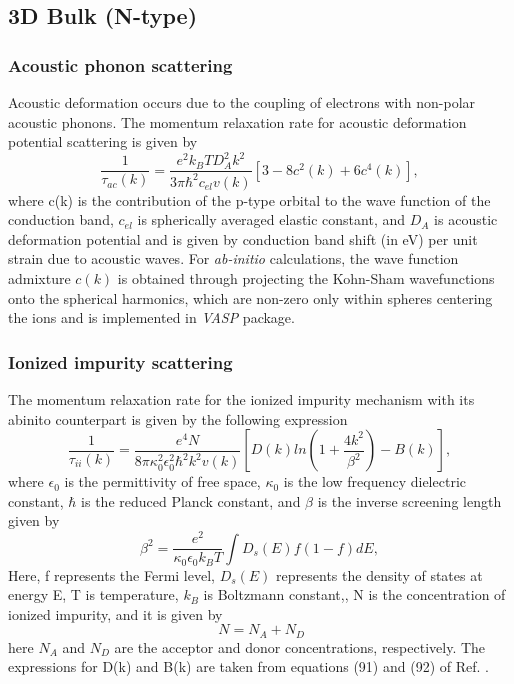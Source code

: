 \documentclass[12pt]{article}
\begin{document}
\subsection{3D Bulk (N-type)}

\subsubsection{Acoustic phonon scattering}

Acoustic deformation occurs due to the coupling of electrons with non-polar acoustic phonons. The momentum relaxation rate for acoustic deformation potential scattering is given by \cite{rode1}
\begin{equation}
\frac{1}{\tau_{ac}(k)} = \frac{e^2 k_B T D_A^2 k^2}{3\pi\hbar^2 c_{el}v(k)}[3 - 8c^2(k)+6c^4(k)] ,
\label{acoustic deformation}
\end{equation}
where c(k) is the contribution of the p-type orbital to the wave function of the conduction band, $c_{el}$ is spherically averaged elastic constant, and $D_A$ is acoustic deformation potential and is given by conduction band shift (in eV) per unit strain due to acoustic waves.  For \textit{ab-initio} calculations, the wave function admixture $c(k)$ is obtained through projecting the Kohn-Sham wavefunctions onto the spherical harmonics, which are non-zero only within spheres centering the ions and is implemented in \textsl{VASP} package. \\

\subsubsection{Ionized impurity scattering}
The momentum relaxation rate for the ionized impurity mechanism with its abinito counterpart is given by the following expression \cite{anup1}
\begin{equation}
\frac{1}{\tau_{ii}(k)} = \frac{e^4 N }{8\pi \kappa_0^2 \epsilon_0^2\hbar^2 k^2 v(k)}[D(k)ln(1+\frac{4k^2}{\beta^2})-B(k)] ,
\label{Ionized impurity}
\end{equation}
where $\epsilon_0$ is the permittivity of free space, $\kappa_0$ is the low frequency dielectric constant, $\hbar$ is the reduced Planck constant, and $\beta$ is the inverse screening length given by
\begin{equation}
\beta^2 = \frac{e^2}{\kappa_0 \epsilon_0 k_B T}\int D_s(E) f(1-f)dE,
\label{beta square}
\end{equation}
Here, f represents the Fermi level, $D_s(E)$ represents the density of states at energy E, T is temperature, $k_B$ is Boltzmann constant,, N is the concentration of ionized impurity, and it is given by
\begin{equation}
\ N = N_A + N_D
\label{impurity}
\end{equation} 
here $N_A$ and $N_D$ are the acceptor and donor concentrations, respectively. The expressions for D(k) and B(k) are taken from equations (91) and (92) of Ref. \cite{rode1}. \\
\end{document}
